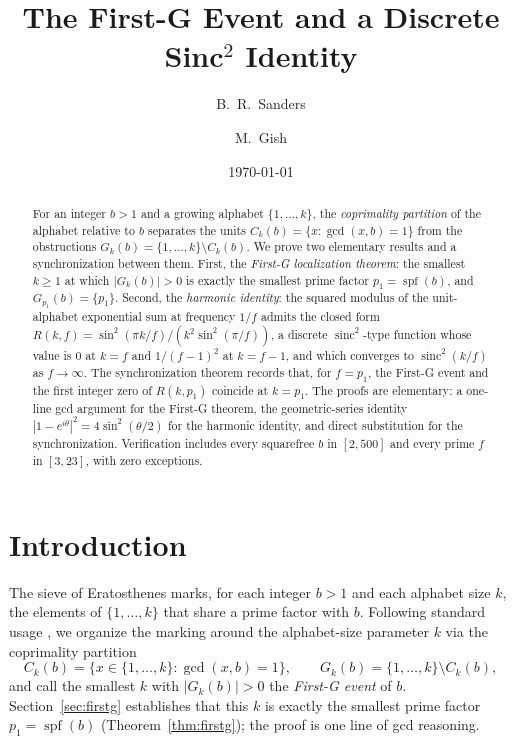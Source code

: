 \documentclass[11pt,reqno]{amsart}
\title[The First-G event and a discrete sinc${}^{2}$ identity]%
{The First-G Event and a Discrete Sinc${}^{2}$ Identity}
\author{B.~R.~Sanders}
\author{M.~Gish}
\date{\today}
\theoremstyle{plain}
\theoremstyle{definition}
\theoremstyle{remark}
\DeclareMathOperator{\spf}{spf}
\DeclareMathOperator{\sinc}{sinc}
\begin{document}
\begin{abstract}
For an integer $b > 1$ and a growing alphabet $\{1,\dots,k\}$, the
\emph{coprimality partition} of the alphabet relative to $b$ separates
the units $C_{k}(b) = \{x : \gcd(x,b) = 1\}$ from the obstructions
$G_{k}(b) = \{1,\dots,k\}\setminus C_{k}(b)$. We prove two elementary
results and a synchronization between them. First, the
\emph{First-G localization theorem}: the smallest $k\ge 1$ at which
$|G_{k}(b)|>0$ is exactly the smallest prime factor $p_{1}=\spf(b)$,
and $G_{p_{1}}(b) = \{p_{1}\}$. Second, the \emph{harmonic identity}:
the squared modulus of the unit-alphabet exponential sum at frequency
$1/f$ admits the closed form
$R(k,f) = \sin^{2}(\pi k/f)/(k^{2}\sin^{2}(\pi/f))$, a discrete
$\sinc^{2}$-type function whose value is $0$ at $k=f$ and $1/(f-1)^{2}$
at $k=f-1$, and which converges to $\sinc^{2}(k/f)$ as $f\to\infty$.
The synchronization theorem records that, for $f = p_{1}$, the First-G
event and the first integer zero of $R(k,p_{1})$ coincide at $k=p_{1}$.
The proofs are elementary: a one-line gcd argument for the
First-G theorem, the geometric-series identity
$|1-e^{i\theta}|^{2} = 4\sin^{2}(\theta/2)$ for the harmonic identity,
and direct substitution for the synchronization. Verification includes
every squarefree $b$ in $[2,500]$ and every prime $f$ in $[3,23]$,
with zero exceptions.
\end{abstract}

\maketitle

\section{Introduction}\label{sec:intro}

The sieve of Eratosthenes marks, for each integer $b > 1$ and each
alphabet size $k$, the elements of $\{1,\dots,k\}$ that share a prime
factor with $b$. Following standard usage \cite{Apostol1976,
HardyWright2008}, we organize the marking around the alphabet-size
parameter $k$ via the coprimality partition
\[
  C_{k}(b) = \{x\in\{1,\dots,k\}:\gcd(x,b)=1\},
  \qquad
  G_{k}(b) = \{1,\dots,k\}\setminus C_{k}(b),
\]
and call the smallest $k$ with $|G_{k}(b)|>0$ the \emph{First-G event}
of $b$. Section~\ref{sec:firstg} establishes that this $k$ is exactly
the smallest prime factor $p_{1} = \spf(b)$
(Theorem~\ref{thm:firstg}); the proof is one line of gcd reasoning.
\end{document}
